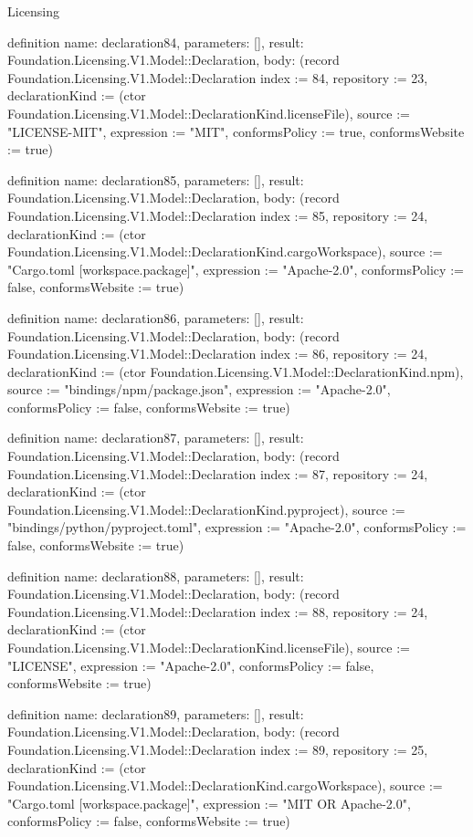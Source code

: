 \begin{lexlean}{Licensing}
\begin{semanticmodule}
definition{
  name: declaration84,
  parameters: [],
  result: Foundation.Licensing.V1.Model::Declaration,
  body: (record Foundation.Licensing.V1.Model::Declaration {index := 84, repository := 23, declarationKind := (ctor Foundation.Licensing.V1.Model::DeclarationKind.licenseFile), source := "LICENSE-MIT", expression := "MIT", conformsPolicy := true, conformsWebsite := true})
}

definition{
  name: declaration85,
  parameters: [],
  result: Foundation.Licensing.V1.Model::Declaration,
  body: (record Foundation.Licensing.V1.Model::Declaration {index := 85, repository := 24, declarationKind := (ctor Foundation.Licensing.V1.Model::DeclarationKind.cargoWorkspace), source := "Cargo.toml [workspace.package]", expression := "Apache-2.0", conformsPolicy := false, conformsWebsite := true})
}

definition{
  name: declaration86,
  parameters: [],
  result: Foundation.Licensing.V1.Model::Declaration,
  body: (record Foundation.Licensing.V1.Model::Declaration {index := 86, repository := 24, declarationKind := (ctor Foundation.Licensing.V1.Model::DeclarationKind.npm), source := "bindings/npm/package.json", expression := "Apache-2.0", conformsPolicy := false, conformsWebsite := true})
}

definition{
  name: declaration87,
  parameters: [],
  result: Foundation.Licensing.V1.Model::Declaration,
  body: (record Foundation.Licensing.V1.Model::Declaration {index := 87, repository := 24, declarationKind := (ctor Foundation.Licensing.V1.Model::DeclarationKind.pyproject), source := "bindings/python/pyproject.toml", expression := "Apache-2.0", conformsPolicy := false, conformsWebsite := true})
}

definition{
  name: declaration88,
  parameters: [],
  result: Foundation.Licensing.V1.Model::Declaration,
  body: (record Foundation.Licensing.V1.Model::Declaration {index := 88, repository := 24, declarationKind := (ctor Foundation.Licensing.V1.Model::DeclarationKind.licenseFile), source := "LICENSE", expression := "Apache-2.0", conformsPolicy := false, conformsWebsite := true})
}

definition{
  name: declaration89,
  parameters: [],
  result: Foundation.Licensing.V1.Model::Declaration,
  body: (record Foundation.Licensing.V1.Model::Declaration {index := 89, repository := 25, declarationKind := (ctor Foundation.Licensing.V1.Model::DeclarationKind.cargoWorkspace), source := "Cargo.toml [workspace.package]", expression := "MIT OR Apache-2.0", conformsPolicy := false, conformsWebsite := true})
}


\end{semanticmodule}
\end{lexlean}
